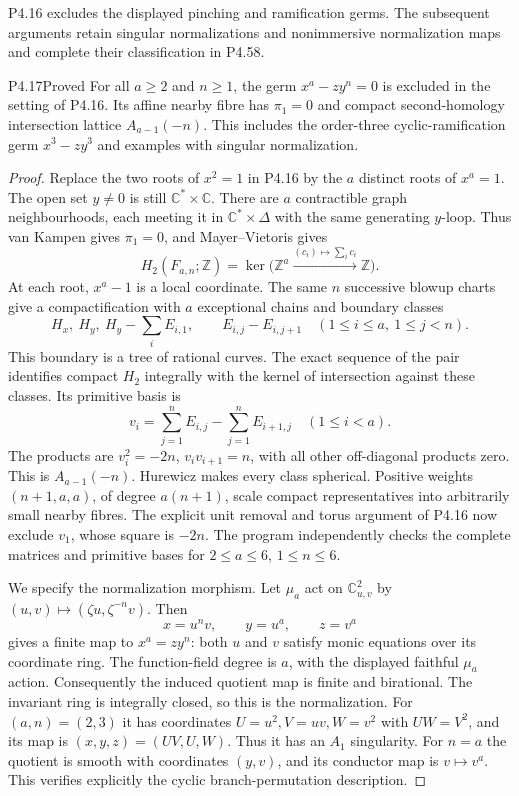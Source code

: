 P4.16 excludes the displayed pinching and ramification germs.
The subsequent arguments retain singular normalizations and
nonimmersive normalization maps and complete their classification
in P4.58.

\begin{statement}{P4.17}{Proved}
For all $a\geq2$ and $n\geq1$, the germ $x^a-zy^n=0$ is
excluded in the setting of P4.16. Its affine nearby fibre has
$\pi_1=0$ and compact second-homology intersection lattice
$A_{a-1}(-n)$. This includes the order-three cyclic-ramification
germ $x^3-zy^3$ and examples with singular normalization.
\end{statement}
\begin{proof}
Replace the two roots of $x^2=1$ in P4.16 by the $a$ distinct
roots of $x^a=1$. The open set $y\ne0$ is still
$\mathbb C^*\times\mathbb C$. There are $a$ contractible graph
neighbourhoods, each meeting it in $\mathbb C^*\times\Delta$
with the same generating $y$-loop. Thus van Kampen gives
$\pi_1=0$, and Mayer--Vietoris gives
\[
 H_2(F_{a,n};\mathbb Z)=\ker\bigl(\mathbb Z^a
   \xrightarrow{(c_i)\mapsto\sum_i c_i}\mathbb Z\bigr).
\]
At each root, $x^a-1$ is a local coordinate. The same $n$
successive blowup charts give a compactification with $a$
exceptional chains and boundary classes
\[
 H_x,\ H_y,\ H_y-\sum_i E_{i,1},\qquad
 E_{i,j}-E_{i,j+1}\quad(1\leq i\leq a,\ 1\leq j<n).
\]
This boundary is a tree of rational curves. The exact sequence
of the pair identifies compact $H_2$ integrally with the kernel
of intersection against these classes. Its primitive basis is
\[
 v_i=\sum_{j=1}^n E_{i,j}-\sum_{j=1}^n E_{i+1,j}
       \quad(1\leq i<a).
\]
The products are $v_i^2=-2n$, $v_iv_{i+1}=n$, with all other
off-diagonal products zero. This is $A_{a-1}(-n)$.
Hurewicz makes every class spherical. Positive weights
$(n+1,a,a)$, of degree $a(n+1)$, scale compact representatives
into arbitrarily small nearby fibres. The explicit unit removal
and torus argument of P4.16 now exclude $v_1$, whose square
is $-2n$. The program independently checks the complete
matrices and primitive bases for $2\leq a\leq6$, $1\leq n\leq6$.

We specify the normalization morphism. Let $\mu_a$ act on
$\mathbb C^2_{u,v}$ by $(u,v)\mapsto(\zeta u,\zeta^{-n}v)$.
Then
\[
 x=u^nv,\qquad y=u^a,\qquad z=v^a
\]
gives a finite map to $x^a=zy^n$: both $u$ and $v$ satisfy
monic equations over its coordinate ring. The function-field
degree is $a$, with the displayed faithful $\mu_a$ action.
Consequently the induced quotient map is finite and birational.
The invariant ring is integrally closed, so this is the
normalization. For $(a,n)=(2,3)$ it has coordinates
$U=u^2,V=uv,W=v^2$ with $UW=V^2$, and its map is
$(x,y,z)=(UV,U,W)$. Thus it has an $A_1$ singularity.
For $n=a$ the quotient is smooth with coordinates $(y,v)$,
and its conductor map is $v\mapsto v^a$. This verifies
explicitly the cyclic branch-permutation description.
\end{proof}

